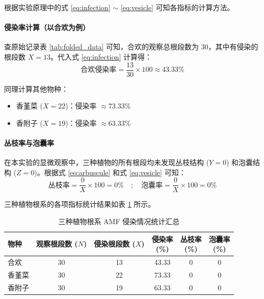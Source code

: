 \documentclass[10.5pt]{config}
\begin{document}
根据实验原理中的式 \ref{eq:infection} $\sim$ \ref{eq:vesicle} 可知各指标的计算方法。

\paragraph{侵染率计算（以合欢为例）}

查原始记录表 \ref{tab:folded_data} 可知，合欢的观察总根段数为 30，其中有侵染的根段数 $X = 13$。代入式 \ref{eq:infection} 计算得：
$$
\text{合欢侵染率} = \frac{13}{30} \times 100 \approx 43.33\%
$$

同理计算其他物种：
\begin{itemize}
    \item 香堇菜 ($X=22$)：侵染率 $\approx 73.33\%$
    \item 香附子 ($X=19$)：侵染率 $\approx 63.33\%$
\end{itemize}

\paragraph{丛枝率与泡囊率}

在本实验的显微观察中，三种植物的所有根段均未发现丛枝结构 ($Y=0$) 和泡囊结构 ($Z=0$)。根据式 \ref{eq:arbuscule} 和式 \ref{eq:vesicle} 可知：
$$
\text{丛枝率} = \frac{0}{X} \times 100 = 0\% \quad ; \quad \text{泡囊率} = \frac{0}{X} \times 100 = 0\%
$$

三种植物根系的各项指标统计结果如表 \ref{tab:amf_results} 所示。

\begin{table}[htbp]
    \centering
    \caption{三种植物根系 AMF 侵染情况统计汇总}
    \label{tab:amf_results}
    \renewcommand{\arraystretch}{1.2} %
    \setlength{\tabcolsep}{10pt}      %
    \begin{tabular}{lccccc}
        \toprule
        \textbf{物种} & \makecell[c]{观察根段数 \\ ($N$)} & \makecell[c]{侵染根段数 \\ ($X$)} & \makecell[c]{侵染率 \\ (\%)} & \makecell[c]{丛枝率 \\ (\%)} & \makecell[c]{泡囊率 \\ (\%)} \\
        \midrule
        合欢   & 30 & 13 & 43.33 & 0 & 0 \\
        香堇菜 & 30 & 22 & 73.33 & 0 & 0 \\
        香附子 & 30 & 19 & 63.33 & 0 & 0 \\
        \bottomrule
    \end{tabular}
\end{table}
\end{document}
